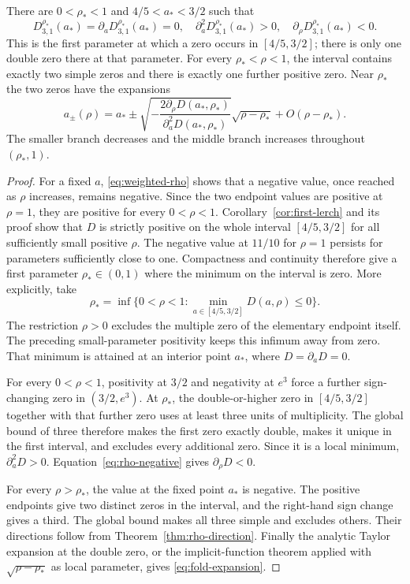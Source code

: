 \begin{theorem}
\label{thm:fold}
There are $0<\rho_*<1$ and $4/5<a_*<3/2$ such that
\[
 D_{3,1}^{\rho_*}(a_*)=\partial_aD_{3,1}^{\rho_*}(a_*)=0,
 \quad \partial_a^2D_{3,1}^{\rho_*}(a_*)>0,
 \quad \partial_\rho D_{3,1}^{\rho_*}(a_*)<0.
\]
This is the first parameter at which a zero occurs in $[4/5,3/2]$;
there is only one double zero there at that parameter. For every
$\rho_*<\rho<1$, the interval contains exactly two simple zeros and
there is exactly one further positive zero. Near $\rho_*$ the two
zeros have the expansions
\begin{equation}\label{eq:fold-expansion}
 a_\pm(\rho)=a_*\pm
 \sqrt{-\frac{2\partial_\rho D(a_*,\rho_*)}
                  {\partial_a^2D(a_*,\rho_*)}}
       \sqrt{\rho-\rho_*}+O(\rho-\rho_*).
\end{equation}
The smaller branch decreases and the middle branch increases throughout
$(\rho_*,1)$.
\end{theorem}
\begin{proof}
For a fixed $a$, \eqref{eq:weighted-rho} shows that a negative value,
once reached as $\rho$ increases, remains negative. Since the two
endpoint values are positive at $\rho=1$, they are positive for every
$0<\rho<1$. Corollary~\ref{cor:first-lerch} and its proof show that
$D$ is strictly positive on the whole interval $[4/5,3/2]$ for all
sufficiently small positive $\rho$. The negative value at $11/10$ for
$\rho=1$ persists for parameters sufficiently close to one. Compactness
and continuity therefore give a first parameter $\rho_*\in(0,1)$
where the minimum on the interval is zero. More explicitly, take
\[
 \rho_*=\inf\{0<\rho<1:\min_{a\in[4/5,3/2]}D(a,\rho)\le0\}.
\]
The restriction $\rho>0$ excludes the multiple zero of the elementary endpoint itself. The preceding small-parameter positivity keeps this infimum away from zero. That minimum is attained
at an interior point $a_*$, where $D=\partial_aD=0$.

For every $0<\rho<1$, positivity at $3/2$ and negativity at $e^3$
force a further sign-changing zero in $(3/2,e^3)$. At $\rho_*$,
the double-or-higher zero in $[4/5,3/2]$ together with that further
zero uses at least three units of multiplicity. The global bound of
three therefore makes the first zero exactly double, makes it unique
in the first interval, and excludes every additional zero. Since it
is a local minimum, $\partial_a^2D>0$. Equation~\eqref{eq:rho-negative}
gives $\partial_\rho D<0$.

For every $\rho>\rho_*$, the value at the fixed point $a_*$ is
negative. The positive endpoints give two distinct zeros in the
interval, and the right-hand sign change gives a third. The global
bound makes all three simple and excludes others. Their directions
follow from Theorem~\ref{thm:rho-direction}. Finally the analytic
Taylor expansion at the double zero, or the implicit-function theorem
applied with $\sqrt{\rho-\rho_*}$ as local parameter, gives
\eqref{eq:fold-expansion}.
\end{proof}

